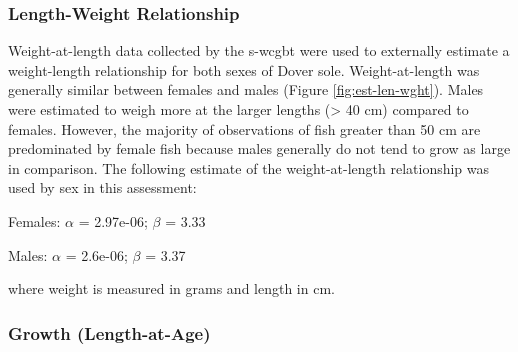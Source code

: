 \documentclass[11pt,
  english,
  a4paper,
]{article}
\begin{document}
\leavevmode\tagmcend\tagstructend\par


\hypertarget{length-weight-relationship}{%
\subsubsection{Length-Weight Relationship}\label{length-weight-relationship}}

\leavevmode\tagmcend\tagstructend


Weight-at-length data collected by the \gls{s-wcgbt} were used to externally estimate a weight-length relationship for both sexes of Dover sole. Weight-at-length was generally similar between females and males (Figure \ref{fig:est-len-wght}). Males were estimated to weigh more at the larger lengths (\textgreater{} 40 cm) compared to females. However, the majority of observations of fish greater than 50 cm are predominated by female fish because males generally do not tend to grow as large in comparison. The following estimate of the weight-at-length relationship was used by sex in this assessment:

\leavevmode\tagmcend\tagstructend\par

\begin{centering}

Females: $\alpha$ = 2.97e-06; $\beta$ = 3.33

Males: $\alpha$ = 2.6e-06; $\beta$ = 3.37

\end{centering}

\vspace{0.50cm}


where weight is measured in grams and length in cm.

\leavevmode\tagmcend\tagstructend\par


\hypertarget{growth-length-at-age}{%
\subsubsection{Growth (Length-at-Age)}\label{growth-length-at-age}}

\leavevmode\tagmcend\tagstructend
\end{document}
